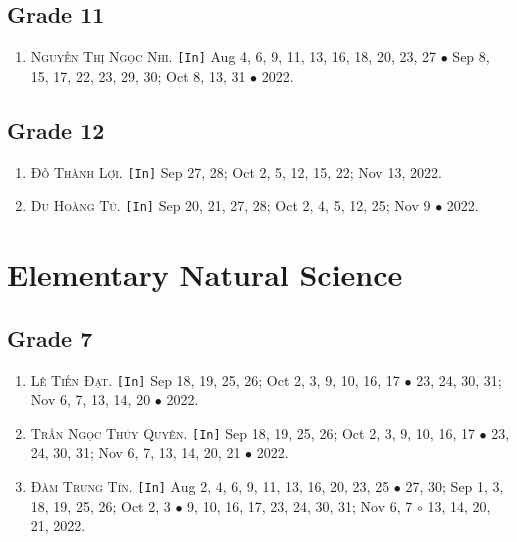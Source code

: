 \documentclass{article}
\numberwithin{equation}{section}
\begin{document}
\subsection{Grade 11}
\begin{enumerate}
	\item \textsc{Nguyễn Thị Ngọc Nhi.} \texttt{[In]} Aug 4, 6, 9, 11, 13, 16, 18, 20, 23, 27 $\bullet$ Sep 8, 15, 17, 22, 23, 29, 30; Oct 8, 13, 31 $\bullet$ 2022.
\end{enumerate}

\subsection{Grade 12}
\begin{enumerate}
	\item \textsc{Đỗ Thành Lợi.} \texttt{[In]} Sep 27, 28; Oct 2, 5, 12, 15, 22; Nov 13, 2022.
	\item \textsc{Du Hoàng Tú.} \texttt{[In]} Sep 20, 21, 27, 28; Oct 2, 4, 5, 12, 25; Nov 9 $\bullet$ 2022.
\end{enumerate}


\section{Elementary Natural Science}

\subsection{Grade 7}
\begin{enumerate}
	\item \textsc{Lê Tiến Đạt.} \texttt{[In]} Sep 18, 19, 25, 26; Oct 2, 3, 9, 10, 16, 17 $\bullet$ 23, 24, 30, 31; Nov 6, 7, 13, 14, 20 $\bullet$ 2022.
	\item \textsc{Trần Ngọc Thúy Quyên.} \texttt{[In]} Sep 18, 19, 25, 26; Oct 2, 3, 9, 10, 16, 17 $\bullet$ 23, 24, 30, 31; Nov 6, 7, 13, 14, 20, 21 $\bullet$ 2022.
	\item \textsc{Đàm Trung Tín.} \texttt{[In]} Aug 2, 4, 6, 9, 11, 13, 16, 20, 23, 25 $\bullet$ 27, 30; Sep 1, 3, 18, 19, 25, 26; Oct 2, 3 $\bullet$ 9, 10, 16, 17, 23, 24, 30, 31; Nov 6, 7 $\circ$ 13, 14, 20, 21, 2022.
\end{enumerate}

\end{document}
